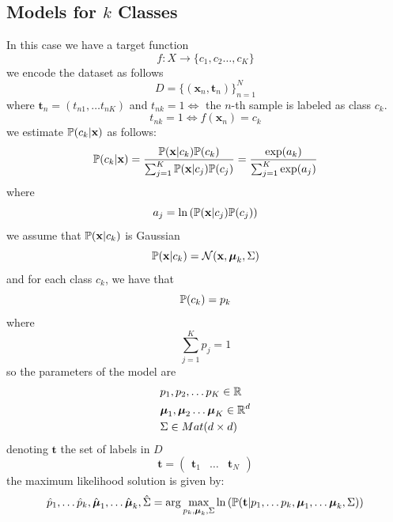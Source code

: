 \documentclass[10pt, letterpaper]{report}
\begin{document}
\subsection{Models for $k$ Classes}
In this case we have a target function\begin{equation}
	f:X\rightarrow\{c_1,c_2\dots,c_K\}
\end{equation}
we encode the dataset as follows\begin{equation}
	D=\{(\mathbf x_n,\mathbf t_n)\}_{n=1}^N
\end{equation}
where $\mathbf t_n=(t_{n1},\dots t_{nK})$ and $t_{nk}=1\iff$ the $n$-th sample is labeled as class $c_k$.\begin{equation}
	t_{nk}=1\iff f(\mathbf x_n)=c_k
\end{equation}
we estimate ${\mathbb P}(c_k|\mathbf x)$ as follows:\begin{equation}
	{\mathbb P}(c_k|\mathbf x)=\frac{{\mathbb P}(\mathbf x|c_k){\mathbb P}(c_k)}{\sum_{j=1}^K{\mathbb P}(\mathbf x|c_j){\mathbb P}(c_j)}=\frac{\exp(a_k)}{\sum_{j=1}^K\exp(a_j)}
\end{equation}
where\begin{equation}
	a_j=\ln\left({\mathbb P}(\mathbf x|c_j){\mathbb P}(c_j)\right)
\end{equation}
we assume that ${\mathbb P}(\mathbf x|c_k)$ is Gaussian\begin{equation}
	{\mathbb P}(\mathbf x|c_k)=\mathcal N(\mathbf x,{\boldsymbol{\mu}}_k,\Sigma)
\end{equation}
and for each class $c_k$, we have that\begin{equation}
	{\mathbb P}(c_k)=p_k
\end{equation}
where \begin{equation}
	\sum_{j=1}^Kp_j=1
\end{equation}
so the parameters of the model are\begin{align}
	 & p_1,p_2,\dots p_K\in {\mathbb R}          \\
	 & {\boldsymbol{\mu}}_1,{\boldsymbol{\mu}}_2\dots {\boldsymbol{\mu}}_K\in{\mathbb R}^d \\
	 & \Sigma\in Mat(d\times d)
\end{align}
denoting $\mathbf t$ the set of labels in $D$\begin{equation}
	\mathbf t = \begin{pmatrix}
		\mathbf t_1 & \dots & \mathbf t_N
	\end{pmatrix}
\end{equation}
the maximum likelihood solution is given by:\begin{equation}
	\hat p_1,\dots \hat p_k,\hat {{\boldsymbol{\mu}}}_1,\dots \hat {{\boldsymbol{\mu}}}_k,\hat \Sigma=\arg\max_{p_k,{\boldsymbol{\mu}}_k,\Sigma}\ln\left(
	{\mathbb P}(\mathbf t|p_1,\dots p_k,{\boldsymbol{\mu}}_1,\dots {\boldsymbol{\mu}}_k,\Sigma)
	\right)
\end{equation}
\end{document}
